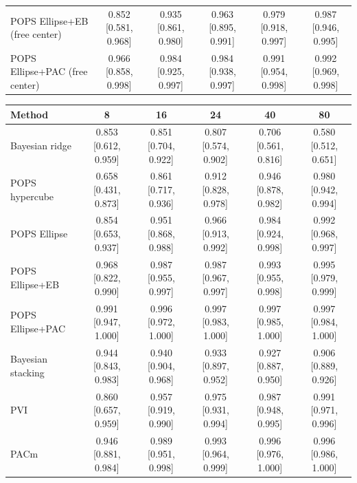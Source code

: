 \begin{tabular}{lccccc}
POPS Ellipse+EB (free center) & 0.852 {\scriptsize[0.581, 0.968]} & 0.935 {\scriptsize[0.861, 0.980]} & 0.963 {\scriptsize[0.895, 0.991]} & 0.979 {\scriptsize[0.918, 0.997]} & 0.987 {\scriptsize[0.946, 0.995]} \\
POPS Ellipse+PAC (free center) & 0.966 {\scriptsize[0.858, 0.998]} & 0.984 {\scriptsize[0.925, 0.997]} & 0.984 {\scriptsize[0.938, 0.997]} & 0.991 {\scriptsize[0.954, 0.998]} & 0.992 {\scriptsize[0.969, 0.998]} \\
\bottomrule
\end{tabular}

\begin{tabular}{lccccc}
\toprule
Method & 8 & 16 & 24 & 40 & 80 \\
\midrule
Bayesian ridge & 0.853 {\scriptsize[0.612, 0.959]} & 0.851 {\scriptsize[0.704, 0.922]} & 0.807 {\scriptsize[0.574, 0.902]} & 0.706 {\scriptsize[0.561, 0.816]} & 0.580 {\scriptsize[0.512, 0.651]} \\
POPS hypercube & 0.658 {\scriptsize[0.431, 0.873]} & 0.861 {\scriptsize[0.717, 0.936]} & 0.912 {\scriptsize[0.828, 0.978]} & 0.946 {\scriptsize[0.878, 0.982]} & 0.980 {\scriptsize[0.942, 0.994]} \\
POPS Ellipse & 0.854 {\scriptsize[0.653, 0.937]} & 0.951 {\scriptsize[0.868, 0.988]} & 0.966 {\scriptsize[0.913, 0.992]} & 0.984 {\scriptsize[0.924, 0.998]} & 0.992 {\scriptsize[0.968, 0.997]} \\
POPS Ellipse+EB & 0.968 {\scriptsize[0.822, 0.990]} & 0.987 {\scriptsize[0.955, 0.997]} & 0.987 {\scriptsize[0.967, 0.997]} & 0.993 {\scriptsize[0.955, 0.998]} & 0.995 {\scriptsize[0.979, 0.999]} \\
POPS Ellipse+PAC & 0.991 {\scriptsize[0.947, 1.000]} & 0.996 {\scriptsize[0.972, 1.000]} & 0.997 {\scriptsize[0.983, 1.000]} & 0.997 {\scriptsize[0.985, 1.000]} & 0.997 {\scriptsize[0.984, 1.000]} \\
Bayesian stacking & 0.944 {\scriptsize[0.843, 0.983]} & 0.940 {\scriptsize[0.904, 0.968]} & 0.933 {\scriptsize[0.897, 0.952]} & 0.927 {\scriptsize[0.887, 0.950]} & 0.906 {\scriptsize[0.889, 0.926]} \\
PVI & 0.860 {\scriptsize[0.657, 0.959]} & 0.957 {\scriptsize[0.919, 0.990]} & 0.975 {\scriptsize[0.931, 0.994]} & 0.987 {\scriptsize[0.948, 0.995]} & 0.991 {\scriptsize[0.971, 0.996]} \\
PACm & 0.946 {\scriptsize[0.881, 0.984]} & 0.989 {\scriptsize[0.951, 0.998]} & 0.993 {\scriptsize[0.964, 0.999]} & 0.996 {\scriptsize[0.976, 1.000]} & 0.996 {\scriptsize[0.986, 1.000]} \\

\end{tabular}
